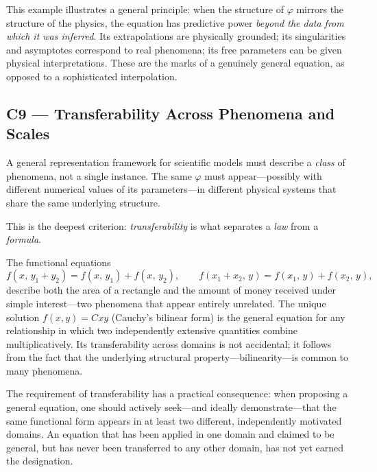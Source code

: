 This example illustrates a general principle: when the structure
of $\varphi$ mirrors the structure of the physics, the equation
has predictive power \emph{beyond the data from which it was
inferred}.  Its extrapolations are physically grounded; its
singularities and asymptotes correspond to real phenomena; its
free parameters can be given physical interpretations.  These are
the marks of a genuinely general equation, as opposed to a
sophisticated interpolation.

\subsection{C9 --- Transferability Across Phenomena and Scales}

\begin{condbox}
\begin{condition}
  \label{cond:ucq:transfer}
A general representation framework for scientific models must describe a \emph{class} of
phenomena, not a single instance.  The same $\varphi$ must
appear---possibly with different numerical values of its
parameters---in different physical systems that share the same
underlying structure.
\end{condition}
\end{condbox}

This is the deepest criterion: \emph{transferability} is what
separates a \emph{law} from a \emph{formula}.

The functional equations
\begin{equation}
  f(x,\,y_1+y_2) = f(x,\,y_1)+f(x,\,y_2),
  \qquad
  f(x_1+x_2,\,y)  = f(x_1,\,y)+f(x_2,\,y),
  \label{eq:ucq:bilinear}
\end{equation}
describe both the area of a rectangle and the amount of money
received under simple interest---two phenomena that appear
entirely unrelated.  The unique solution $f(x,y)=Cxy$ (Cauchy's
bilinear form) is the general equation for any relationship in
which two independently extensive quantities combine
multiplicatively.  Its transferability across domains is not
accidental; it follows from the fact that the underlying structural
property---bilinearity---is common to many phenomena.

The requirement of transferability has a practical consequence:
when proposing a general equation, one should actively seek---and
ideally demonstrate---that the same functional form appears in at
least two different, independently motivated domains.  An equation
that has been applied in one domain and claimed to be general, but
has never been transferred to any other domain, has not yet earned
the designation.




